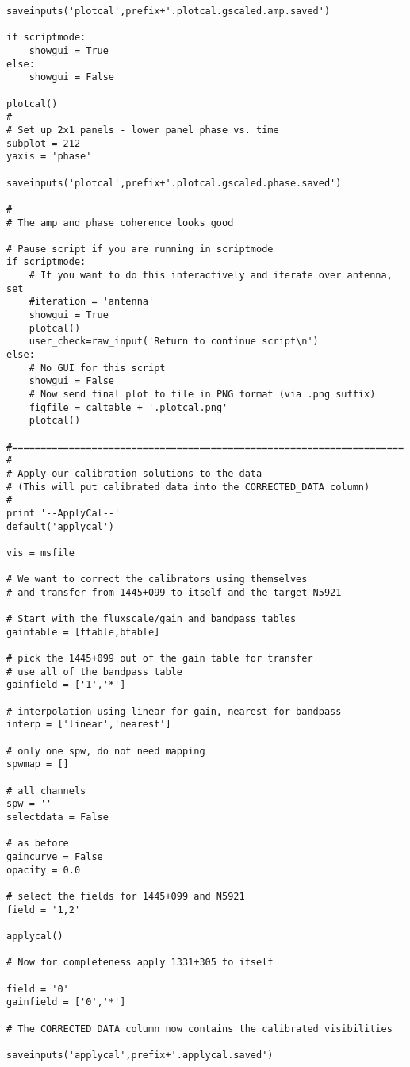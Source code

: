\begin{verbatim}
saveinputs('plotcal',prefix+'.plotcal.gscaled.amp.saved')

if scriptmode:
    showgui = True
else:
    showgui = False

plotcal()
#
# Set up 2x1 panels - lower panel phase vs. time
subplot = 212
yaxis = 'phase'

saveinputs('plotcal',prefix+'.plotcal.gscaled.phase.saved')

#
# The amp and phase coherence looks good

# Pause script if you are running in scriptmode
if scriptmode:
    # If you want to do this interactively and iterate over antenna, set
    #iteration = 'antenna'
    showgui = True
    plotcal()
    user_check=raw_input('Return to continue script\n')
else:
    # No GUI for this script
    showgui = False
    # Now send final plot to file in PNG format (via .png suffix)
    figfile = caltable + '.plotcal.png'
    plotcal()

#=====================================================================
#
# Apply our calibration solutions to the data
# (This will put calibrated data into the CORRECTED_DATA column)
#
print '--ApplyCal--'
default('applycal')

vis = msfile

# We want to correct the calibrators using themselves
# and transfer from 1445+099 to itself and the target N5921

# Start with the fluxscale/gain and bandpass tables
gaintable = [ftable,btable]

# pick the 1445+099 out of the gain table for transfer
# use all of the bandpass table
gainfield = ['1','*']

# interpolation using linear for gain, nearest for bandpass
interp = ['linear','nearest']

# only one spw, do not need mapping
spwmap = []

# all channels
spw = ''
selectdata = False

# as before
gaincurve = False
opacity = 0.0

# select the fields for 1445+099 and N5921
field = '1,2'

applycal()

# Now for completeness apply 1331+305 to itself

field = '0'
gainfield = ['0','*']

# The CORRECTED_DATA column now contains the calibrated visibilities

saveinputs('applycal',prefix+'.applycal.saved')


\end{verbatim}
